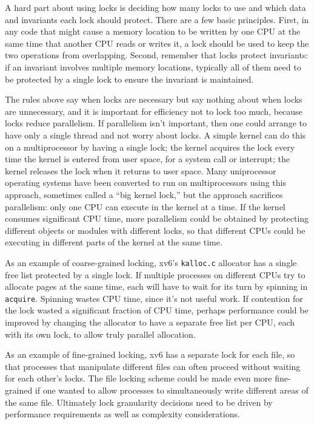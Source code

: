 A hard part about using locks is deciding how many locks
to use and which data and invariants each lock should protect.
There are a few basic principles.
First, in any code that might cause a memory location to be
written by one CPU 
at the same time that another CPU reads or writes it,
a lock should be used to keep the two
operations from overlapping.
Second, remember that locks protect invariants:
if an invariant involves multiple memory locations,
typically all of them need to be protected
by a single lock to ensure the invariant is maintained.

The rules above say when locks are necessary but say nothing about when locks
are unnecessary, and it is important for efficiency not to lock too much,
because locks reduce parallelism.  If parallelism isn't important, then one
could arrange to have only a single thread and not worry about locks.  A simple
kernel can do this on a multiprocessor by having a single lock;
the kernel acquires the lock every time the kernel is entered
from user space, for a system call or interrupt;
the kernel releases the lock when it returns to user space.
Many uniprocessor operating systems have been converted to
run on multiprocessors using this approach, sometimes called a ``big
kernel lock,'' but the approach sacrifices parallelism: only one
CPU can execute in the kernel at a time.  If the kernel consumes
significant CPU time, more parallelism could be obtained by
protecting different objects or modules with different locks,
so that different CPUs could be
executing in different parts of the kernel at the same time.

As an example of coarse-grained locking, xv6's \lstinline{kalloc.c}
allocator has a single free list protected by a single lock. If
multiple processes on different CPUs try to allocate pages at the same
time, each will have to wait for its turn by spinning in {\tt
  acquire}. Spinning wastes CPU time, since it's not useful work.
If contention for the lock wasted a significant fraction of CPU time,
perhaps performance could be improved by changing the allocator 
to have a separate free list per CPU, each with its own lock, to allow truly
parallel allocation.

As an example of fine-grained locking, xv6 has a separate lock for
each file, so that processes that manipulate different files can often
proceed without waiting for each other's locks. The file locking
scheme could be made even more fine-grained if one wanted to allow
processes to simultaneously write different areas of the same file.
Ultimately lock granularity decisions need to be driven by 
performance requirements as well as complexity considerations.

